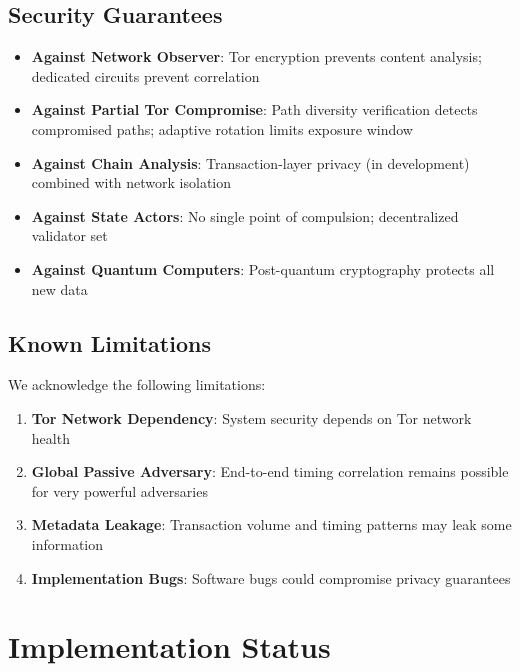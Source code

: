 \documentclass[11pt,a4paper]{article}
\begin{document}
\subsection{Security Guarantees}

\begin{itemize}[leftmargin=*]
    \item \textbf{Against Network Observer}: Tor encryption prevents content analysis; dedicated circuits prevent correlation
    \item \textbf{Against Partial Tor Compromise}: Path diversity verification detects compromised paths; adaptive rotation limits exposure window
    \item \textbf{Against Chain Analysis}: Transaction-layer privacy (in development) combined with network isolation
    \item \textbf{Against State Actors}: No single point of compulsion; decentralized validator set
    \item \textbf{Against Quantum Computers}: Post-quantum cryptography protects all new data
\end{itemize}

\subsection{Known Limitations}

We acknowledge the following limitations:

\begin{enumerate}[leftmargin=*]
    \item \textbf{Tor Network Dependency}: System security depends on Tor network health
    \item \textbf{Global Passive Adversary}: End-to-end timing correlation remains possible for very powerful adversaries
    \item \textbf{Metadata Leakage}: Transaction volume and timing patterns may leak some information
    \item \textbf{Implementation Bugs}: Software bugs could compromise privacy guarantees
\end{enumerate}

\section{Implementation Status}
\end{document}

